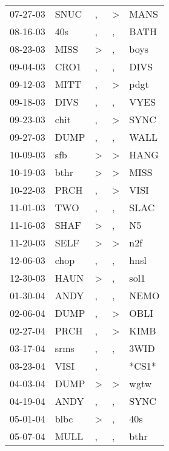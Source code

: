 \begin{supertabular}{lllll}
 07-27-03 &   SNUC &                , &  \textgreater &   MANS \\
 08-16-03 &    40s &                , &             , &   BATH \\
 08-23-03 &   MISS &     \textgreater &             , &   boys \\
 09-04-03 &   CRO1 &                , &             , &   DIVS \\
 09-12-03 &   MITT &                , &  \textgreater &   pdgt \\
 09-18-03 &   DIVS &                , &             , &   VYES \\
 09-23-03 &   chit &                , &  \textgreater &   SYNC \\
 09-27-03 &   DUMP &                , &             , &   WALL \\
 10-09-03 &    sfb &     \textgreater &  \textgreater &   HANG \\
 10-19-03 &   bthr &     \textgreater &  \textgreater &   MISS \\
 10-22-03 &   PRCH &                , &  \textgreater &   VISI \\
 11-01-03 &    TWO &                , &             , &   SLAC \\
 11-16-03 &   SHAF &     \textgreater &             , &     N5 \\
 11-20-03 &   SELF &     \textgreater &  \textgreater &    n2f \\
 12-06-03 &   chop &                , &             , &   hnsl \\
 12-30-03 &   HAUN &     \textgreater &             , &   sol1 \\
 01-30-04 &   ANDY &                , &             , &   NEMO \\
 02-06-04 &   DUMP &                , &  \textgreater &   OBLI \\
 02-27-04 &   PRCH &                , &  \textgreater &   KIMB \\
 03-17-04 &   srms &                , &             , &   3WID \\
 03-23-04 &   VISI &                , &               &  *CS1* \\
 04-03-04 &   DUMP &     \textgreater &  \textgreater &   wgtw \\
 04-19-04 &   ANDY &                , &             , &   SYNC \\
 05-01-04 &   blbc &     \textgreater &             , &    40s \\
 05-07-04 &   MULL &                , &             , &   bthr \\

\end{supertabular}

